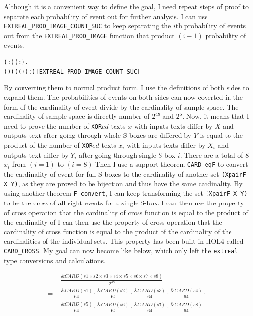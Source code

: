 \documentclass{article}
\begin{document}
Although it is a convenient way to define the goal, I need repeat steps of proof to separate each probability of event out
for further analysis. I can use \verb|EXTREAL_PROD_IMAGE_COUNT_SUC| to keep separating the $i$th probability of events out from the
\verb|EXTREAL_PROD_IMAGE| function that product $(i-1)$ probability of events.

\begin{alltt}
\HOLTokenTurnstile{} \HOLSymConst{\HOLTokenForall{}}( : \HOLTokenMap{} ) ( :).
     \HOLSymConst{\HOLTokenPI{}}  ( ) \HOLSymConst{=} ((\HOLSymConst{\HOLTokenPI{}}  ( ) \HOLSymConst{\HOLTokenProd{}}  ) :)\hfill{[EXTREAL_PROD_IMAGE_COUNT_SUC]}
\end{alltt}

By converting them to normal product form, I use the definitions
of both sides to expand them. The probabilities of events on both sides can now coverted in the form of the cardinality of event divide by
the cardinality of sample space. The cardinality of sample space is directly number of $2^{48}$ and $2^{6}$.
Now, it means that I need to prove the number of \verb|XOR|$ed$ texts $x$ with inputs texts differ by $X$ and outputs text after going through whole
S-boxes are differed by $Y$ is equal to
the product of the number of \verb|XOR|$ed$ texts $x_i$ with inputs texts differ by $X_i$ and outputs text differ by $Y_i$ after going through single
S-box $i$. There are a total of 8 $x_i$ from $(i=1)$ to $(i=8)$
Then I use a support theorem
\verb|CARD_eqF| to convert the cardinality of event for full S-boxes to the cardinality of another set \verb|(XpairF X Y)|, as they are proved
to be bijection and thus have the same cardinality. By using another theorem \verb|F_convert|, I can keep transforming the set \verb|(XpairF X Y)|
to be the cross of all eight events for a single S-box. I can then use the property of cross operation that the cardinality of cross function is equal
to the product of the cardinality of I can then use the property of cross operation that the cardinality of cross function is equal
to the product of the cardinality of the cardinalities of the individual sets. This property has been built in HOL4
called \verb|CARD_CROSS|. My goal can now become like below, which only left the \verb|extreal| type conversions and calculations.

\begin{align*}
   & \frac{\&CARD(s1 \times s2 \times s3 \times s4 \times s5 \times s6 \times s7 \times s8)}{2^{48}} \\
  = \; & \frac{\&CARD(s1)}{64} \cdot \frac{\&CARD(s2)}{64} \cdot \frac{\&CARD(s3)}{64} \cdot \frac{\&CARD(s4)}{64} \cdot \\
     & \frac{\&CARD(s5)}{64} \cdot \frac{\&CARD(s6)}{64} \cdot \frac{\&CARD(s7)}{64} \cdot \frac{\&CARD(s8)}{64}
\end{align*}
\end{document}
